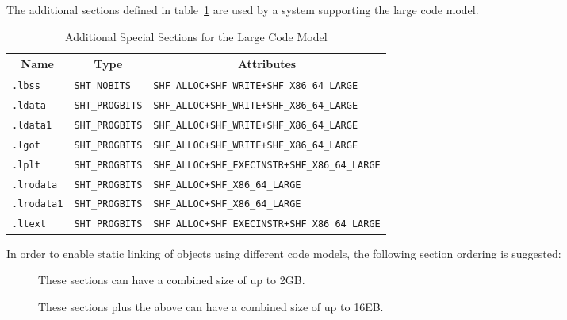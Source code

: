The additional sections defined in table~\ref{large_sections} are used
by a system supporting the large code model.

\begin{table}[H]
\Hrule
  \caption{Additional Special Sections for the Large Code Model}
  \label{large_sections}
  \begin{center}
    \begin{tabular}[t]{l|l|l}
      \multicolumn{1}{c}{Name} & \multicolumn{1}{c}{Type}
       & \multicolumn{1}{c}{Attributes} \\
      \hline
      \texttt{.lbss} & \texttt{SHT_NOBITS} &
         \texttt{SHF_ALLOC+SHF_WRITE+SHF_X86_64_LARGE} \\
      \texttt{.ldata} & \texttt{SHT_PROGBITS} &
         \texttt{SHF_ALLOC+SHF_WRITE+SHF_X86_64_LARGE} \\
      \texttt{.ldata1} & \texttt{SHT_PROGBITS} &
         \texttt{SHF_ALLOC+SHF_WRITE+SHF_X86_64_LARGE} \\
      \texttt{.lgot} & \texttt{SHT_PROGBITS} &
         \texttt{SHF_ALLOC+SHF_WRITE+SHF_X86_64_LARGE} \\
      \texttt{.lplt} & \texttt{SHT_PROGBITS} &
         \texttt{SHF_ALLOC+SHF_EXECINSTR+SHF_X86_64_LARGE} \\
      \texttt{.lrodata} & \texttt{SHT_PROGBITS} &
         \texttt{SHF_ALLOC+SHF_X86_64_LARGE} \\
      \texttt{.lrodata1} & \texttt{SHT_PROGBITS} &
         \texttt{SHF_ALLOC+SHF_X86_64_LARGE} \\
      \texttt{.ltext} & \texttt{SHT_PROGBITS} &
         \texttt{SHF_ALLOC+SHF_EXECINSTR+SHF_X86_64_LARGE} \\
    \end{tabular}
  \end{center}
\Hrule
\end{table}

In order to enable static linking of objects using different code
models, the following section ordering is suggested:

\begin{description}
  \item[] These sections can have a combined size of up to 2GB.
  \item[] These sections plus the above can have a combined size of up
   to 16EB.
\end{description}

